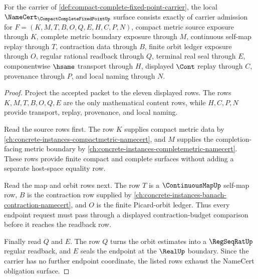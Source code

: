 \begin{theorem}
\label{thm:compact-complete-fixed-point-namecert-obligations}
For the carrier of \autoref{def:compact-complete-fixed-point-carrier}, the local $\NameCert_{\CompactCompleteFixedPointUp}$ surface consists exactly of carrier admission for $F=(K,M,T,B,O,Q,E,H,C,P,N)$, compact metric source exposure through $K$, complete metric boundary exposure through $M$, continuous self-map replay through $T$, contraction data through $B$, finite orbit ledger exposure through $O$, regular rational readback through $Q$, terminal real seal through $E$, componentwise $\hsame$ transport through $H$, displayed $\Cont$ replay through $C$, provenance through $P$, and local naming through $N$.
\end{theorem}
\begin{proof}
Project the accepted packet to the eleven displayed rows. The rows $K,M,T,B,O,Q,E$ are the only mathematical content rows, while $H,C,P,N$ provide transport, replay, provenance, and local naming.

Read the source rows first. The row $K$ supplies compact metric data by \autoref{ch:concrete-instances-compactmetric-namecert}, and $M$ supplies the completion-facing metric boundary by \autoref{ch:concrete-instances-completemetric-namecert}. These rows provide finite compact and complete surfaces without adding a separate host-space equality row.

Read the map and orbit rows next. The row $T$ is a $\ContinuousMapUp$ self-map row, $B$ is the contraction row supplied by \autoref{ch:concrete-instances-banach-contraction-namecert}, and $O$ is the finite Picard-orbit ledger. Thus every endpoint request must pass through a displayed contraction-budget comparison before it reaches the readback row.

Finally read $Q$ and $E$. The row $Q$ turns the orbit estimates into a $\RegSeqRatUp$ regular readback, and $E$ seals the endpoint at the $\RealUp$ boundary. Since the carrier has no further endpoint coordinate, the listed rows exhaust the NameCert obligation surface.
\end{proof}

